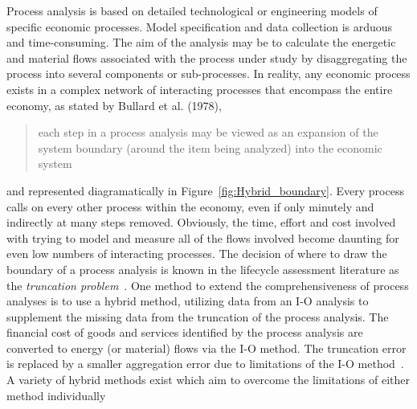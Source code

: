 Process analysis is based on detailed technological
or engineering models of specific economic processes.
Model specification and data collection is arduous and
time-consuming.
The aim of the analysis may be to calculate the
energetic and material flows associated with the process
under study by disaggregating the process into
several components or sub-processes.
In reality,
any economic process exists in a complex network of
interacting processes that encompass the entire economy,
as stated by Bullard et al. (1978), 
\begin{quote}
	each step in a process analysis may be viewed as 
	an expansion of the system boundary 
	(around the item being analyzed) 
	into the economic system~\cite[p.281]{Bullard:1978vd}
\end{quote}
and represented diagramatically in Figure~\ref{fig:Hybrid_boundary}.
Every process calls on every other process within the economy,
even if only minutely and indirectly at many steps removed.
Obviously,
the time, 
effort and cost involved with trying to model and
measure all of the flows involved become daunting
for even low numbers of interacting processes.
The decision of where to draw the boundary of
a process analysis is known in the 
lifecycle assessment literature as the 
\emph{truncation problem}~\cite{Suh2004}.
One method to extend the comprehensiveness of process
analyses is to use a hybrid method,
utilizing data from an I-O analysis to supplement the
missing data from the truncation of the process analysis.
The financial cost of goods and services identified by
the process analysis are converted to energy
(or material) flows via the I-O method.
The truncation error is replaced by a smaller aggregation
error due to limitations of the I-O 
method~\cite{Bullard:1978vd}.
A variety of hybrid methods exist which aim to
overcome the limitations of either method 
individually~\cite{Bullard:1978vd, Suh2004, Suh2002, 
Crawford2008, Zhai2010}


